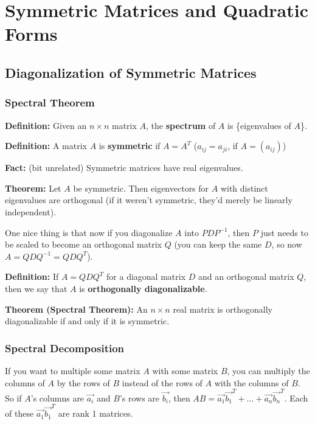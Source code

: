 \section{Symmetric Matrices and Quadratic Forms}

\subsection{Diagonalization of Symmetric Matrices}

\subsubsection*{Spectral Theorem}

\textbf{Definition:} Given an $n \times n$ matrix $A$, the \textbf{spectrum} of $A$ is \{eigenvalues of $A$\}.

\textbf{Definition:} A matrix $A$ is \textbf{symmetric} if $A = A^T$ ($a_{ij} = a_{ji}$, if $A = (a_{ij})$)

\textbf{Fact:} (bit unrelated) Symmetric matrices have real eigenvalues.

\textbf{Theorem:} Let $A$ be symmetric. Then eigenvectors for $A$ with distinct eigenvalues are orthogonal (if it weren't symmetric, they'd merely be linearly independent).

One nice thing is that now if you diagonalize $A$ into $PDP^{-1}$, then $P$ just needs to be scaled to become an orthogonal matrix $Q$ (you can keep the same $D$, so now $A = QDQ^{-1} = QDQ^T$).

\textbf{Definition:} If $A = QDQ^T$ for a diagonal matrix $D$ and an orthogonal matrix $Q$, then we say that $A$ is \textbf{orthogonally diagonalizable}.

\textbf{Theorem (Spectral Theorem):} An $n \times n$ real matrix is orthogonally diagonalizable if and only if it is symmetric.

\subsubsection*{Spectral Decomposition}

If you want to multiple some matrix $A$ with some matrix $B$, you can multiply the columns of $A$ by the rows of $B$ instead of the rows of $A$ with the columns of $B$. So if $A$'s columns are $\Vec{a_i}$ and $B$'s rows are $\Vec{b_i}$, then $AB = \Vec{a_1}\Vec{b_1}^T + ... + \Vec{a_n}\Vec{b_n}^T$. Each of these $\Vec{a_1}\Vec{b_1}^T$ are rank 1 matrices.

